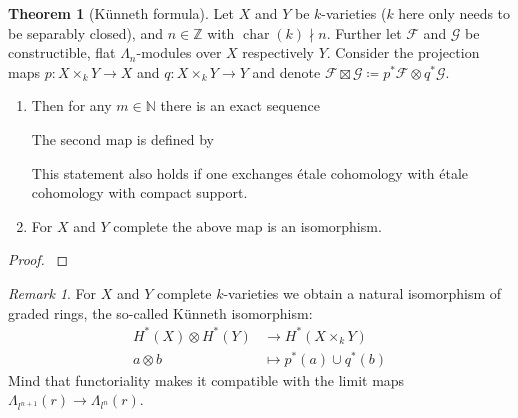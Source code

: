 \documentclass[english]{scrartcl}
\theoremstyle{definition}
\newtheorem{Thm}[Def]{Theorem}
\theoremstyle{remark}
\newtheorem{Rem}[Def]{Remark}
\newcommand*{\N}{\mathds{N}}
\newcommand*{\Z}{\mathds{Z}}
\newcommand*{\Zmod}[1]{\Z/#1} %
\newcommand*{\F}{\mathcal{F}} %
\newcommand*{\G}{\mathcal{G}} %
\DeclareMathOperator{\Char}{char} %
\DeclareMathOperator{\Tor}{Tor} %
\begin{document}
\begin{Thm}[Künneth formula]\label{kuennethiso}
  Let $X$ and $Y$ be $k$-varieties
  ($k$ here only needs to be separably closed), and
  $n\in\Z$ with $\Char(k)\nmid n$.
  Further let $\F$ and $\G$ be constructible, flat $\Lambda_n$-modules
  over $X$ respectively $Y$.
  Consider the projection maps
  $p\colon X\times_k Y\to X$ and
  $q\colon X\times_k Y\to Y$ and denote
  $\F\boxtimes\G\coloneqq p^*\F\otimes q^*\G$. 
  \begin{enumerate}
  \item   Then for any $m\in\N$ there is an exact sequence
    \begin{center}
    \end{center}
    The second map is defined by
    \begin{center}
    \end{center}
    This statement also holds if one exchanges étale cohomology with
    étale cohomology with compact support.
  \item For $X$ and $Y$ complete the above map is an isomorphism. 
  \end{enumerate}
  \begin{proof}\cite[][Thm.~V.8.5 and Cor.~V.8.13]{milnebook}\end{proof}
\end{Thm}

\begin{Rem}
  For $X$ and $Y$ complete $k$-varieties we obtain a natural
  isomorphism of graded rings, the so-called Künneth isomorphism:
  \begin{align*}
    H^*(X)\otimes H^*(Y) &\rightarrow H^*(X\times_k Y)\\
    a\otimes b &\mapsto p^*(a) \cup q^*(b)
  \end{align*}
  Mind that functoriality makes it compatible with the limit maps
  $\Lambda_{l^{n+1}}(r)\to\Lambda_{l^n}(r)$.
\end{Rem}
\end{document}
